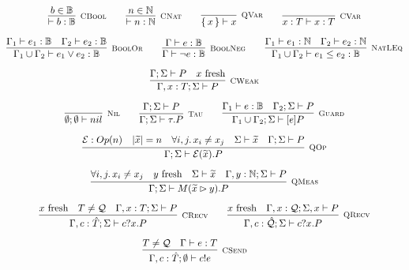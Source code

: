 \begin{gather*}
\infer[\mbox{\footnotesize\scshape CBool}]{\vdash b : \mathbb{B}}{b \in \mathbb{B}} \qquad
\infer[\mbox{\footnotesize\scshape CNat}]{\vdash n : \mathbb{N}}{n \in \mathbb{N}} \qquad
\infer[\mbox{\footnotesize\scshape QVar}]{\set{x} \vdash x}{} \qquad
\infer[\mbox{\footnotesize\scshape CVar}]{x : T \vdash x : T}{} \\[0.2cm]
\infer[\mbox{\footnotesize\scshape BoolOr}]{\Gamma_1 \cup \Gamma_2 \vdash e_1 \lor e_2 : \mathbb{B}}{\Gamma_1 \vdash e_1 : \mathbb{B} & \Gamma_2 \vdash e_2 : \mathbb{B}} \qquad
\infer[\mbox{\footnotesize\scshape BoolNeg}]{\Gamma \vdash \neg e : \mathbb{B}}{\Gamma \vdash e : \mathbb{B}} \qquad
\infer[\mbox{\footnotesize\scshape NatLEq}]{\Gamma_1 \cup \Gamma_2 \vdash e_1 \leq e_2 : \mathbb{B}}{\Gamma_1 \vdash e_1 : \mathbb{N} & \Gamma_2 \vdash e_2 : \mathbb{N}} \\[0.2cm]
 \infer[\mbox{\footnotesize\scshape CWeak}]{\Gamma, x : T; \Sigma \vdash P}{\Gamma; \Sigma \vdash P & \text{$x$ fresh}} \\[0.2cm]
\infer[\mbox{\footnotesize\scshape Nil}]{\emptyset; \emptyset \vdash nil}{} \qquad
\infer[\mbox{\footnotesize\scshape Tau}]{\Gamma; \Sigma \vdash \tau . P}{ \Gamma; \Sigma \vdash P} \qquad
\infer[\mbox{\footnotesize\scshape Guard}]{\Gamma_1 \cup \Gamma_2; \Sigma \vdash [e] P}{\Gamma_1 \vdash e : \mathbb{B} & \Gamma_2; \Sigma \vdash P} \\[0.2cm]
\infer[\mbox{\footnotesize\scshape QOp}]
{\Gamma; \Sigma \vdash \mathcal{E}(\widetilde{x}) . P}
{\mathcal{E}: Op(n) & |\widetilde{x}| = n & \forall i, j \ldotp x_i \neq x_j & \Sigma \vdash \widetilde{x} & \Gamma; \Sigma \vdash P} \\[0.2cm]
\infer[\mbox{\footnotesize\scshape QMeas}]{\Gamma; \Sigma \vdash M(\widetilde{x} \rhd y) . P}
{\forall i, j \ldotp x_i \neq x_j & \text{$y$ fresh} & \Sigma \vdash \widetilde{x} & \Gamma, y : \mathbb{N}; \Sigma \vdash P} \\[0.2cm]
\infer[\mbox{\footnotesize\scshape CRecv}]
{\Gamma, c : \hat{T}; \Sigma \vdash c?x . P}
{\text{$x$ fresh} & T \neq \mathcal{Q} & \Gamma, x : T; \Sigma \vdash P} 
\qquad
\infer[\mbox{\footnotesize\scshape QRecv}]
{\Gamma, c : \hat{\mathcal{Q}}; \Sigma \vdash c?x . P}
{\text{$x$ fresh} & \Gamma, x : \mathcal{Q}; \Sigma, x \vdash P} 
\\[0.2cm]
\infer[\mbox{\footnotesize\scshape CSend}]{\Gamma, c : \hat{T}; \emptyset \vdash c!e}{T \neq \mathcal{Q} & \Gamma \vdash e : T} \qquad

\end{gather*}
